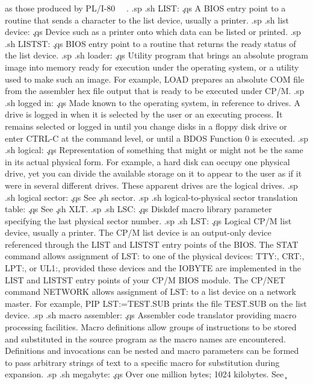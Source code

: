 as those produced by PL/I-80 \ \ .
.sp
.sh
LIST:  \c
.qs
A BIOS entry point to a routine that sends a character to the 
list device, usually a printer.
.sp
.sh
list device:  \c
.qs
Device such as a printer onto which data can be listed or 
printed.
.sp
.sh
LISTST:  \c
.qs
BIOS entry point to a routine that returns the ready status of 
the list device.
.sp
.sh
loader:  \c
.qs
Utility program that brings an absolute program image into memory 
ready for execution under the operating system, or a utility used 
to make such an image.  For example, LOAD prepares an absolute 
COM file from the assembler hex file output that is ready to be 
executed under CP/M.
.sp
.sh
logged in:  \c
.qs
Made known to the operating system, in reference to drives.  A 
drive is logged in when it is selected by the user or an 
executing process.  It remains selected or logged in until you 
change disks in a floppy disk drive or enter CTRL-C at the 
command level, or until a BDOS Function 0 is executed.
.sp
.sh
logical:  \c
.qs
Representation of something that might or might not be the same 
in its actual physical form.  For example, a hard disk can occupy 
one physical drive, yet you can divide the available storage on 
it to appear to the user as if it were in several different 
drives.  These apparent drives are the logical drives.
.sp
.sh
logical sector:  \c
.qs
See \c
.sh
sector.
.sp
.sh
logical-to-physical sector translation table:  \c
.qs
See \c
.sh
XLT.
.sp
.sh
LSC:  \c
.qs
Diskdef macro library parameter specifying the last physical 
sector number.
.sp
.sh
LST:  \c
.qs
Logical CP/M list device, usually a printer.  The CP/M list 
device is an output-only device referenced through the LIST and 
LISTST entry points of the BIOS.  The STAT command allows 
assignment of LST: to one of the physical devices:  TTY:, CRT:, 
LPT:, or UL1:, provided these devices and the IOBYTE are 
implemented in the LIST and LISTST entry points of your CP/M BIOS 
module.  The CP/NET command NETWORK allows assignment of LST: to 
a list device on a network master.  For example, PIP LST:=TEST.SUB 
prints the file TEST.SUB on the list device.
.sp
.sh
macro assembler:  \c
.qs
Assembler code translator providing macro processing facilities.  
Macro definitions allow groups of instructions to be stored and 
substituted in the source program as the macro names are 
encountered.  Definitions and invocations can be nested and macro 
parameters can be formed to pass arbitrary strings of text to a 
specific macro for substitution during expansion.
.sp
.sh
megabyte:  \c
.qs
Over one million bytes; 1024 kilobytes.  See \c
